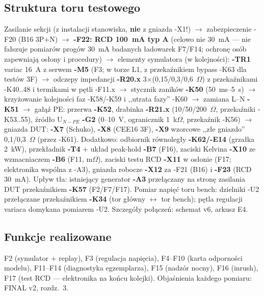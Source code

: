 \documentclass[11pt,a4paper]{article}
\newcommand{\ohm}{$\Omega$}
\begin{document}
\subsection{Struktura toru testowego}
Zasilanie sekcji (z instalacji stanowiska, \textbf{nie} z gniazda -X1!) $\to$ zabezpieczenie
-F20 (B16 3P$+$N) $\to$ \textbf{-F22: RCD 100~mA typ A} (celowo nie 30~mA --- nie fałszuje
pomiarów progów 30~mA badanych ładowarek F7/F14; ochronę osób zapewniają osłony i procedury)
$\to$ elementy symulatora (w kolejności): \textbf{-TR1} variac 16~A z serwem \textbf{-M5}
(F3; w torze L1, z przekaźnikiem bypass -K63 dla testów 3F) $\to$ odczepy impedancji
\textbf{-R20.x} 3$\times$(0,15/0,3/0,6~\ohm) z przekaźnikami -K40..48 i termikami w pętli -F11.x
$\to$ stycznik zaników \textbf{-K50} (50~ms--5~s) $\to$ krzyżowanie kolejności faz -K58/-K59
i ,,utrata fazy'' -K60 $\to$ zamiana L--N \textbf{-K51} $\to$ gałąź PE: przerwa \textbf{-K52},
drabinka \textbf{-R21.x} (10/50/200~\ohm, przekaźniki -K53..55), źródło U$_{N-PE}$ \textbf{-G2}
(0--10~V, ogranicznik 1~k\ohm, przekaźnik -K56) $\to$ gniazda DUT: \textbf{-X7} (Schuko),
\textbf{-X8} (CEE16 3F), \textbf{-X9} wzorcowe ,,złe gniazdo'' 0,1/0,3~\ohm{} (przez -K61).
Dodatkowo: odbiornik równoległy \textbf{-K62/-E14} (grzałka 2~kW), przekładnik \textbf{-T4}
$+$ układ peak-hold \textbf{-B7} (F16), zaciski Kelvina \textbf{-X10} ze wzmacniaczem
\textbf{-B6} (F11, m\ohm), zaciski testu RCD \textbf{-X11} w osłonie (F17; elektronika wspólna
z -A3), gniazda robocze \textbf{-X12} za -F21 (B16) i \textbf{-F23} (RCD 30~mA).
Upływ tła: istniejący generator \textbf{-A3} przełączany na stronę zasilania DUT przekaźnikiem
\textbf{-K57} (F2/F7/F17). Pomiar napięć toru bench: dzielniki -U2 przełączane przekaźnikiem
\textbf{-K34} (tor główny $\leftrightarrow$ tor bench); pętla regulacji variaca domykana pomiarem
-U2. Szczegóły połączeń: schemat v6, arkusz E4.
\subsection{Funkcje realizowane}
F2 (symulator $+$ replay), F3 (regulacja napięcia), F4--F10 (karta odporności modelu),
F11--F14 (diagnostyka egzemplarza), F15 (nadzór nocny), F16 (inrush), F17 (test RCD ---
elektronika na końcu kolejki). Objaśnienia każdego pomiaru: FINAL v2, rozdz.~3.
\end{document}
